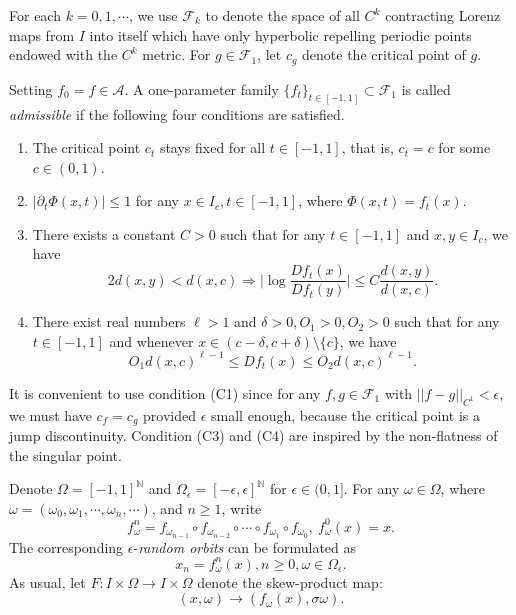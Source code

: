 \documentclass[11pt,oneside]{article}
\theoremstyle{plain}
\numberwithin{equation}{section}
\numberwithin{figure}{section}
\numberwithin{table}{section}
\begin{document}
For each $k =0, 1, \cdots$, we use $\mathscr F_k$ to denote the space of all $C^k$ contracting Lorenz maps from $I$ into itself which have only hyperbolic repelling periodic points endowed with the $C^k$ metric. For $g \in \mathscr F_1$, let $c_g$ denote the critical point of $g$.


Setting $f_0 = f \in \mathcal A$. A one-parameter family $\{ f_t \}_{t \in [-1, 1]} \subset \mathscr F_1$ is called {\it admissible} if the following four conditions are satisfied. 


\begin{enumerate}

\item[(C1)] The critical point $c_t$ stays fixed for all $t \in [-1, 1]$, that is, $c_t = c$ for some $c \in (0, 1)$. 

\item[(C2)] $|\partial_t \Phi(x, t)| \leq 1$ for any $x \in I_c, t \in [-1, 1]$, where $\Phi(x, t) = f_t(x) $.

\item[(C3)] There exists a constant $C > 0$ such that for any $t \in [-1, 1]$ and $x, y \in I_c$, we have
\begin{equation}
2 d(x, y) < d(x , c) \Longrightarrow \bigg| \log \frac{Df_t(x)}{Df_t(y)} \bigg| \leq C \frac{d(x, y)}{d(x, c)}.
\end{equation}
\item[(C4)] There exist real numbers $\ell >1$ and $\delta>0, O_1>0, O_2 >0$ such that for any $t \in [-1, 1]$ and whenever $x \in (c -\delta, c+\delta) \setminus \{ c\}$, we have
\[
O_1 d(x, c)^{\ell-1} \leq Df_t(x) \leq O_2  d(x, c)^{\ell-1}.
\]
\end{enumerate}


It is convenient to use condition (C1) since for any $f, g \in \mathscr F_1$ with $|| f-g||_{C^1} < \epsilon$, we must have $c_f = c_g$ provided $\epsilon$ small enough, because the critical point is a jump discontinuity. Condition (C3) and (C4) are inspired by the non-flatness of the singular point. 


Denote $\Omega = [-1, 1]^{\mathbb N}$ and $\Omega_{\epsilon} = [-\epsilon, \epsilon]^{\mathbb N}$ for $\epsilon \in (0, 1]$. For any $\omega \in \Omega$, where $\omega = (\omega_0, \omega_1, \cdots, \omega_n, \cdots)$, and $n \geq 1$, write 
\begin{equation}
f_{\omega}^n = f_{\omega_{n-1}} \circ f_{\omega_{n-2}} \circ \cdots \circ f_{\omega_1} \circ f_{\omega_0}, \ f_{\omega}^0(x) = x.
\end{equation}
The corresponding $\epsilon$-{\it random orbits} can be formulated as 
\[
x_n = f_{\omega}^n(x), n \geq 0, \omega \in  \Omega_{\epsilon}.
\]
As usual, let $F : I \times \Omega \to I \times \Omega$ denote the skew-product map:
\[
(x, \omega) \to (f_{\omega}(x), \sigma \omega).
\]
\end{document}

